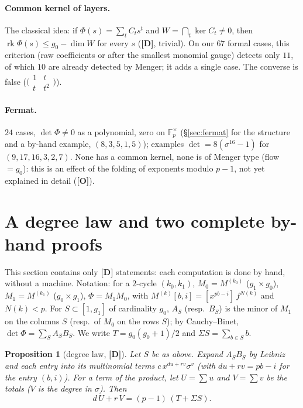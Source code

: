 \documentclass[11pt,a4paper]{article}
\newtheorem{proposition}[theorem]{Proposition}
\newcommand{\F}{\mathbb{F}}
\begin{document}
\paragraph{Common kernel of layers.} The classical idea: if
$\Phi(s)=\sum_tC_ts^t$ and $W=\bigcap_t\ker C_t\neq0$, then
$\operatorname{rk}\Phi(s)\le g_0-\dim W$ for every $s$ (\textbf{[D]}, trivial).
On our $67$ formal cases, this criterion (raw coefficients or after the smallest
monomial gauge) detects only $11$, of which $10$ are already detected by Menger;
it adds a single case. The converse is false
($\bigl(\begin{smallmatrix}1&t\\t&t^2\end{smallmatrix}\bigr)$).

\paragraph{Fermat.} $24$ cases, $\det\Phi\ne0$ as a polynomial, zero on
$\F_p^\times$ (\S\ref{sec:fermat} for the structure and a by-hand example,
$(8,3,5,1,5)$); examples $\det=8(\sigma^{16}-1)$ for $(9,17,16,3,2,7)$. None has
a common kernel, none is of Menger type (flow $=g_0$): this is an effect of the
folding of exponents modulo $p-1$, not yet explained in detail (\textbf{[O]}).

\section{A degree law and two complete by-hand proofs}
\label{sec:stylo}

This section contains only \textbf{[D]} statements: each computation is done by
hand, without a machine. Notation: for a $2$-cycle $(k_0,k_1)$,
$M_0=M^{(k_0)}$ ($g_1\times g_0$), $M_1=M^{(k_1)}$ ($g_0\times g_1$),
$\Phi=M_1M_0$, with $M^{(k)}[b,i]=[x^{pb-i}]\,f^{N(k)}$ and $N(k)<p$. For
$S\subset[1,g_1]$ of cardinality $g_0$, $A_S$ (resp.\ $B_S$) is the minor of $M_1$
on the columns $S$ (resp.\ of $M_0$ on the rows $S$); by Cauchy--Binet,
$\det\Phi=\sum_SA_SB_S$. We write $T=g_0(g_0+1)/2$ and $\Sigma S=\sum_{b\in S}b$.

\begin{proposition}[degree law, \textbf{[D]}]
\label{prop:deg}
Let $S$ be as above. Expand $A_SB_S$ by Leibniz and each entry into its
multinomial terms $c\,x^{du+rv}\sigma^v$ (with $du+rv=pb-i$ for the entry
$(b,i)$). For a term of the product, let $U=\sum u$ and $V=\sum v$ be the totals
($V$ is the degree in $\sigma$). Then
$$d\,U+r\,V=(p-1)\,(T+\Sigma S).$$
\end{proposition}
\end{document}

